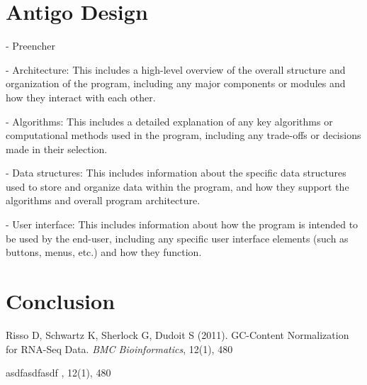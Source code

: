 \documentclass[12pt]{article}
\begin{document}
\section{Antigo Design}\label{sec:desenvolvimentos}
- Preencher

- Architecture: This includes a high-level overview of the overall structure and organization of the program, including any major components or modules and how they interact with each other.

- Algorithms: This includes a detailed explanation of any key algorithms or computational methods used in the program, including any trade-offs or decisions made in their selection.

- Data structures: This includes information about the specific data structures used to store and organize data within the program, and how they support the algorithms and overall program architecture.

- User interface: This includes information about how the program is intended to be used by the end-user, including any specific user interface elements (such as buttons, menus, etc.) and how they function.






\section{Conclusion}\label{sec:conclusoes}



\begin{thebibliography}{}

Risso D, Schwartz K, Sherlock G, Dudoit S (2011). GC-Content Normalization for RNA-Seq Data. \textit{BMC Bioinformatics}, 12(1), 480

asdfasdfasdf \textit{}, 12(1), 480

\end{thebibliography}
\end{document}
